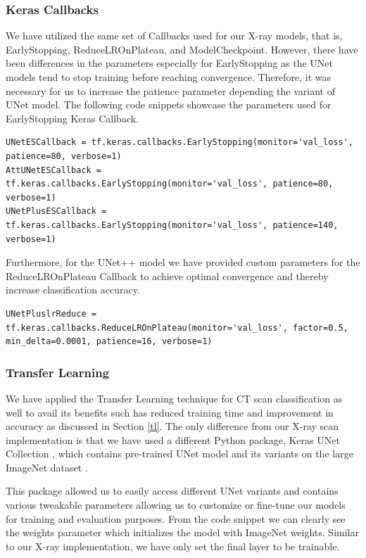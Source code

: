 \subsubsection{Keras Callbacks}

We have utilized the same set of Callbacks used for our X-ray models, that is, EarlyStopping, ReduceLROnPlateau, and ModelCheckpoint. However, there have been differences in the parameters especially for EarlyStopping as the UNet models tend to stop training before reaching convergence. Therefore, it was necessary for us to increase the patience parameter depending the variant of UNet model. The following code snippets showcase the parameters used for EarlyStopping Keras Callback.

\vspace{1em}
\begin{lstlisting}
UNetESCallback = tf.keras.callbacks.EarlyStopping(monitor='val_loss', patience=80, verbose=1)
AttUNetESCallback = tf.keras.callbacks.EarlyStopping(monitor='val_loss', patience=80, verbose=1)
UNetPlusESCallback = tf.keras.callbacks.EarlyStopping(monitor='val_loss', patience=140, verbose=1)
\end{lstlisting}

Furthermore, for the UNet++ model we have provided custom parameters for the ReduceLROnPlateau Callback to achieve optimal convergence and thereby increase classification accuracy.

\vspace{1em}
\begin{lstlisting}
UNetPluslrReduce = tf.keras.callbacks.ReduceLROnPlateau(monitor='val_loss', factor=0.5, min_delta=0.0001, patience=16, verbose=1)
\end{lstlisting}

\subsubsection{Transfer Learning}

We have applied the Transfer Learning technique for CT scan classification as well to avail its benefits such has reduced training time and improvement in accuracy as discussed in Section \ref{tl}. The only difference from our X-ray scan implementation is that we have used a different Python package, Keras UNet Collection \cite{KUC}, which contains pre-trained UNet model and its variants on the large ImageNet dataset \cite{IMG}. 

This package allowed us to easily access different UNet variants and contains various tweakable parameters allowing us to customize or fine-tune our models for training and evaluation purposes. From the code snippet we can clearly see the weights parameter which initializes the model with ImageNet weights. Similar to our X-ray implementation, we have only set the final layer to be trainable.

